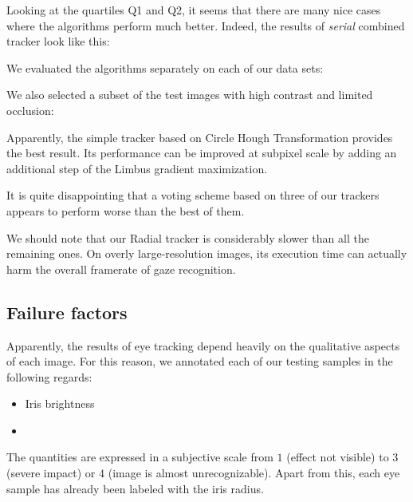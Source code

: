 Looking at the quartiles Q1 and Q2, it seems that there are many nice cases where the algorithms perform much better.
Indeed, the results of \textit{serial} combined tracker look like this:\\

We evaluated the algorithms separately on each of our data sets:\\

We also selected a subset of the test images with high contrast and limited occlusion:\\

Apparently, the simple tracker based on Circle Hough Transformation provides the best result.
Its performance can be improved at subpixel scale by adding an additional step of the Limbus gradient maximization.

It is quite disappointing that a voting scheme based on three of our trackers appears to perform worse than the best of them.

We should note that our Radial tracker is considerably slower than all the remaining ones.
On overly large-resolution images, its execution time can actually harm the overall framerate of gaze recognition.

\subsection{Failure factors}
\label{s:results-eyecovar}

Apparently, the results of eye tracking depend heavily on the qualitative aspects of each image.
For this reason, we annotated each of our testing samples in the following regards:
\begin{itemize}
\item Iris brightness
\item {}
\end{itemize}
The quantities are expressed in a subjective scale from $1$ (effect not visible) to $3$ (severe impact) or $4$ (image is almost unrecognizable).
Apart from this, each eye sample has already been labeled with the iris radius.

